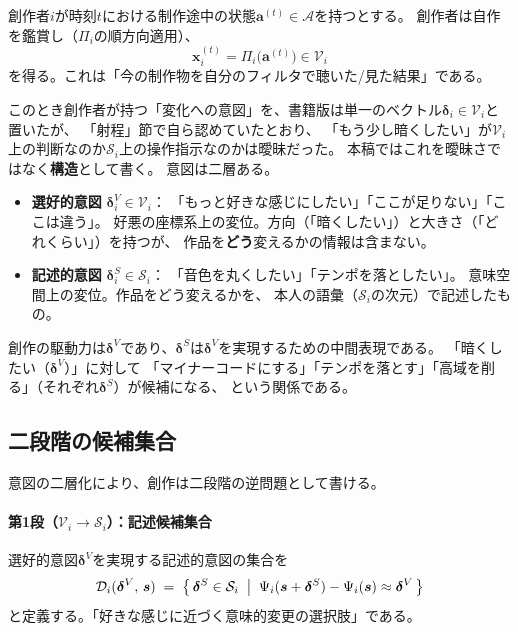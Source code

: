 \documentclass[a4paper, fontsize=10pt]{jlreq}
\newcommand{\vx}{\bm{x}}
\newcommand{\va}{\bm{a}}
\newcommand{\vs}{\bm{s}}
\newcommand{\A}{\mathcal{A}}
\newcommand{\Si}{\mathcal{S}_i}
\newcommand{\Vi}{\mathcal{V}_i}
\newcommand{\Psii}{\Psi_i}
\newcommand{\dV}{\bm{\delta}^{V}}          %
\newcommand{\dS}{\bm{\delta}^{S}}          %
\newcommand{\Di}{\mathcal{D}_i}            %
\begin{document}
創作者$i$が時刻$t$における制作途中の状態$\va^{(t)} \in \A$を持つとする。
創作者は自作を鑑賞し（$\Pi_i$の順方向適用）、
\begin{equation}
  \vx_i^{(t)} = \Pi_i\bigl(\va^{(t)}\bigr) \in \Vi
\end{equation}
を得る。これは「今の制作物を自分のフィルタで聴いた/見た結果」である。

このとき創作者が持つ「変化への意図」を、書籍版は単一のベクトル$\bm{\delta}_i \in \Vi$と置いたが、
「射程」節で自ら認めていたとおり、
「もう少し暗くしたい」が$\Vi$上の判断なのか$\Si$上の操作指示なのかは曖昧だった。
本稿ではこれを曖昧さではなく\textbf{構造}として書く。
意図は二層ある。

\begin{itemize}[leftmargin=2em]
  \item \textbf{選好的意図} $\dV_i \in \Vi$：
    「もっと好きな感じにしたい」「ここが足りない」「ここは違う」。
    好悪の座標系上の変位。方向（「暗くしたい」）と大きさ（「どれくらい」）を持つが、
    作品を\textbf{どう}変えるかの情報は含まない。
  \item \textbf{記述的意図} $\dS_i \in \Si$：
    「音色を丸くしたい」「テンポを落としたい」。
    意味空間上の変位。作品をどう変えるかを、
    本人の語彙（$\Si$の次元）で記述したもの。
\end{itemize}

創作の駆動力は$\dV$であり、$\dS$は$\dV$を実現するための中間表現である。
「暗くしたい（$\dV$）」に対して
「マイナーコードにする」「テンポを落とす」「高域を削る」（それぞれ$\dS$）が候補になる、
という関係である。

\subsection{二段階の候補集合}\label{subsec:candidate-set}

意図の二層化により、創作は二段階の逆問題として書ける。

\paragraph{第1段（$\Vi \to \Si$）：記述候補集合}
選好的意図$\dV$を実現する記述的意図の集合を
\begin{equation}\label{eq:desc-set}
  \Di(\dV,\, \vs)
  \;=\;
  \bigl\{\, \dS \in \Si
    \;\bigm|\;
    \Psii(\vs + \dS) - \Psii(\vs) \approx \dV
  \,\bigr\}
\end{equation}
と定義する。「好きな感じに近づく意味的変更の選択肢」である。
\end{document}

